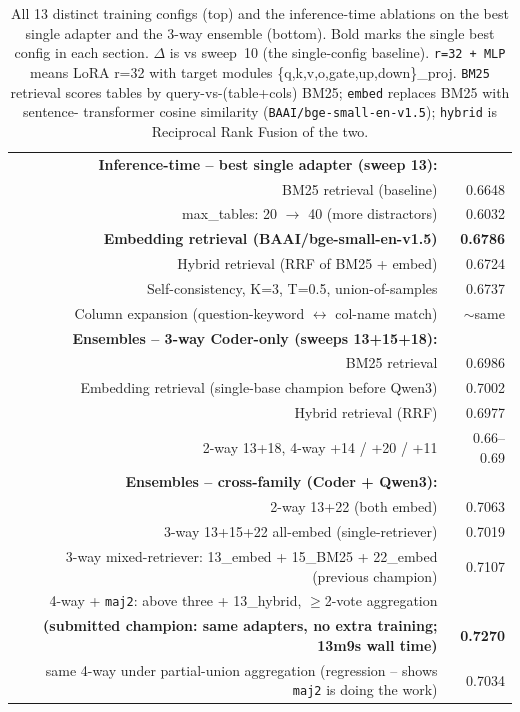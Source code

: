 \documentclass[10pt]{article}
\begin{document}
\begin{table}[t]
\begin{tabular}{rllrrrr}
\midrule
\multicolumn{6}{r}{\textbf{Inference-time -- best single adapter (sweep 13):}} & \\
\multicolumn{6}{r}{BM25 retrieval (baseline)} & 0.6648 \\
\multicolumn{6}{r}{max\_tables: 20 $\rightarrow$ 40 (more distractors)} & 0.6032 \\
\multicolumn{6}{r}{\textbf{Embedding retrieval (BAAI/bge-small-en-v1.5)}} & \textbf{0.6786} \\
\multicolumn{6}{r}{Hybrid retrieval (RRF of BM25 + embed)} & 0.6724 \\
\multicolumn{6}{r}{Self-consistency, K=3, T=0.5, union-of-samples} & 0.6737 \\
\multicolumn{6}{r}{Column expansion (question-keyword $\leftrightarrow$ col-name match)} & $\sim$same \\
\midrule
\multicolumn{6}{r}{\textbf{Ensembles -- 3-way Coder-only (sweeps 13+15+18):}} & \\
\multicolumn{6}{r}{BM25 retrieval} & 0.6986 \\
\multicolumn{6}{r}{Embedding retrieval (single-base champion before Qwen3)}    & 0.7002 \\
\multicolumn{6}{r}{Hybrid retrieval (RRF)}                                    & 0.6977 \\
\multicolumn{6}{r}{2-way 13+18, 4-way +14 / +20 / +11}                        & 0.66--0.69 \\
\multicolumn{6}{r}{\textbf{Ensembles -- cross-family (Coder + Qwen3):}} & \\
\multicolumn{6}{r}{2-way 13+22 (both embed)} & 0.7063 \\
\multicolumn{6}{r}{3-way 13+15+22 all-embed (single-retriever)} & 0.7019 \\
\multicolumn{6}{r}{3-way mixed-retriever: 13\_embed + 15\_BM25 + 22\_embed (previous champion)}
                                                              & 0.7107 \\
\multicolumn{6}{r}{4-way + \texttt{maj2}: above three + 13\_hybrid, $\geq$2-vote aggregation} & \\
\multicolumn{6}{r}{\textbf{(submitted champion: same adapters, no extra training; 13m9s wall time)}}
                                                              & \textbf{0.7270} \\
\multicolumn{6}{r}{$~~~$same 4-way under partial-union aggregation (regression -- shows \texttt{maj2} is doing the work)} & 0.7034 \\
\bottomrule
\end{tabular}
\caption{All 13 distinct training configs (top) and the inference-time ablations
on the best single adapter and the 3-way ensemble (bottom). Bold marks the
single best config in each section. $\Delta$ is vs sweep~10 (the
single-config baseline). \texttt{r=32 + MLP} means LoRA r=32 with target
modules \{q,k,v,o,gate,up,down\}\_proj. \texttt{BM25} retrieval scores tables
by query-vs-(table+cols) BM25; \texttt{embed} replaces BM25 with sentence-
transformer cosine similarity (\texttt{BAAI/bge-small-en-v1.5}); \texttt{hybrid}
is Reciprocal Rank Fusion of the two.}
\label{tab:configs}
\end{table}
\end{document}
